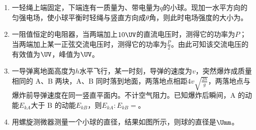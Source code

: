 \documentclass[\gkver]{gaokaozhenti}
\begin{document}
\begin{enumerate}
\item
一轻绳上端固定，下端连有一质量为、带电量为$q$的小球。现加一水平方向的匀强电场，使小球平衡时轻绳与竖直方向成$\theta$角，则此时电场强度的大小为。

\item
一阻值恒定的电阻器，当两端加上$10\UV$的直流电压时，测得它的功率为$P$；当两端加上某一正弦交流电压时，测得它的功率为$\frac{P}{2}$。由此可知该交流电压的有效值为$\UV$，峰值为$\UV$。

\item
一导弹离地面高度为$h$水平飞行，某一时刻，导弹的速度为$v$，突然爆炸成质量相同的 A、B 两块，A、B 同时落到地面，两落地点相距$4v\sqrt{\frac{2h}{g}}$，两落地点与爆炸前导弹速度在同一竖直平面内。不计空气阻力。已知爆炸后瞬间，A 的动能$E_{kA}$大于 B 的动能$E_{kB}$，则$E_{kA}:E_{kB}=$。

\item
用螺旋测微器测量一个小球的直径，结果如图所示，则球的直径是$\Umm$。
\jdanswer{
$10.965\Umm$
}


\end{enumerate}
\end{document}
